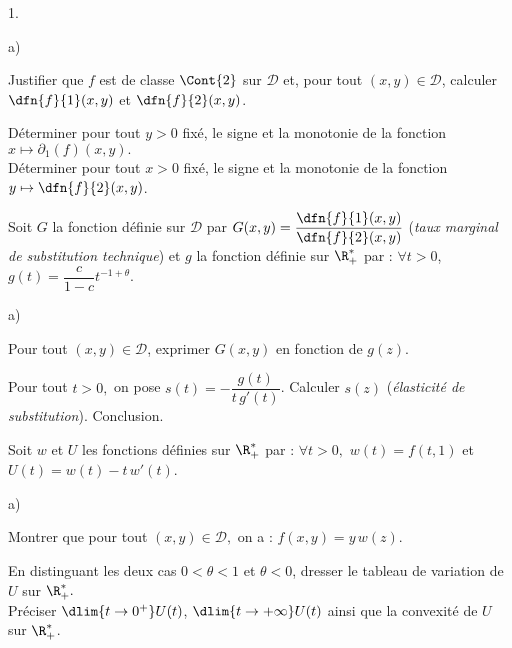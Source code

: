 \documentclass[11pt]{article}%
\begin{document}
\begin{noliste}{1.}
\begin{noliste}{a)}
  

  
  \item Justifier que $f$ est de classe $\Cont{2}$ sur $\mathcal{D}$ 
  et, pour tout $(x,y) \in \mathcal{D}$, calculer $\dfn{f}{1}(x,y)$ et 
  $\dfn{f}{2}(x,y)$.
  
  
  
  
  
  
  
  

  
  \item Déterminer pour tout $y>0$ fixé, le signe et la monotonie de la 
  fonction $x \mapsto \partial_1(f)(x,y).$\\
  Déterminer pour tout $x>0$ fixé, le signe et la monotonie de 
  la fonction $y \mapsto \dfn{f}{2}(x,y)$.
  
  

 \end{noliste}
 
 \item Soit $G$ la fonction définie sur $\mathcal{D}$ par 
 $G(x,y)=\dfrac{\dfn{f}{1}(x,y)}{\dfn{f}{2}(x,y)}$ 
 ({\it taux marginal de substitution technique}) et $g$ la fonction 
 définie sur $\R_+^*$ par : $\forall t>0$, 
 $g(t)=\dfrac{c}{1-c}t^{-1+\theta}$.
 \begin{noliste}{a)}
  \setlength{\itemsep}{2mm}
  \item Pour tout $(x,y) \in \mathcal{D}$, exprimer $G(x,y)$ en 
  fonction de $g(z)$.
  
  

  
  \item\label{3b} Pour tout $t>0,$ on pose $s(t)=-\dfrac{g(t)}{t 
  \, g'(t)}$.
  Calculer $s(z)$ ({\it élasticité de substitution}). Conclusion.
  
  
 \end{noliste}
 
 
 
 
 
 
 
 
 \item Soit $w$ et $U$ les fonctions définies sur $\R_+^*$ par :
 $\forall t>0,$ $w(t)=f(t,1)$ et $U(t)=w(t)-t \, w'(t)$.
 \begin{noliste}{a)}
  \setlength{\itemsep}{2mm}
  \item Montrer que pour tout $(x,y) \in \mathcal{D},$ on a : 
  $f(x,y)=y \, w(z)$.
  
  

  
  \item En distinguant les deux cas $0 < \theta < 1$ et $\theta < 0$, 
  dresser le tableau de variation de $U$ sur $\R_+^*.$\\
  Préciser $\dlim{t \to 0^+} U(t)$, $\dlim{t \to + \infty} U(t)$ ainsi 
  que la convexité de $U$ sur $\R_+^*$.
  
  
 \end{noliste}
\end{noliste}
\end{document}
